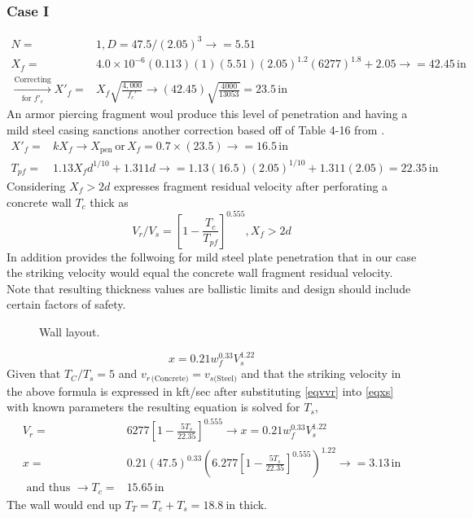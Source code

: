 \documentclass[]{article} %
\begin{document}
\subsubsection*{Case I}
\begin{align}\nonumber
 N=&1, D=47.5/(2.05)^3\rightarrow =5.51\\
X_f=&4.0\times10^{-6}(0.113)(1)(5.51)(2.05)^{1.2}(6277)^{1.8}+2.05\rightarrow=42.45\,\mathrm{in}\nonumber\\
\xrightarrow[\text{for }f'_c]{\text{Correcting}} X'_f=&X_f\sqrt{\frac{4,000}{f_c'}}\rightarrow(42.45)\sqrt{\frac{4000}{13053}}=23.5\,\mathrm{in}\nonumber
\end{align}
An armor piercing fragment woul produce this level of penetration and having a mild steel casing sanctions another correction based off of Table 4-16 from \cite{ufc3340022014}.
\begin{align}\nonumber
X'_f=&kX_f\rightarrow X_\mathrm{pen}\,\text{or}\, X_f=0.7\times(23.5)\rightarrow=16.5\,\mathrm{in}\\\nonumber
T_{pf}=&1.13X_fd^{1/10}+1.311d\rightarrow=1.13(16.5)(2.05)^{1/10}+1.311(2.05)=22.35\,\mathrm{in}\nonumber
\end{align} 
Considering $X_f>2d$ \cite{ufc3340022014} expresses fragment residual velocity after perforating a concrete wall $T_c$ thick as
\begin{equation}\label{eqvvr}
V_r/V_s=\left[1-\frac{T_c}{T_{pf}}\right]^{0.555}, X_f>2d
\end{equation}
In addition \cite{ufc3340022014} provides the follwoing for mild steel plate penetration that in our case the striking velocity would equal the concrete wall fragment residual velocity. Note that resulting thickness values are ballistic limits and design should include certain factors of safety.
\begin{figure}\centering\caption{Wall layout.}\label{fig01}
\end{figure}
\begin{equation}\label{eqxs}
x=0.21w_f^{0.33}V_s^{1.22}
\end{equation}
Given that $T_C/T_s=5$ and $v_{r\,\text{(Concrete)}}=v_{s\text{(Steel)}}$ and that the striking velocity in the above formula is expressed in kft/sec after substituting \cref{eqvvr} into \cref{eqxs} with known parameters the resulting equation is solved for $T_s$,
\begin{align}\nonumber
V_r=&6277\left[1-\frac{5T_s}{22.35}\right]^{0.555}\rightarrow x=0.21w_f^{0.33}V_s^{1.22}\\\nonumber
 x=&0.21(47.5)^{0.33}\left(6.277\left[1-\frac{5T_s}{22.35}\right]^{0.555}\right)^{1.22}\rightarrow=3.13\,\mathrm{in}\\\nonumber
 \text{ and thus }\rightarrow T_c=&15.65\,\mathrm{in}
\end{align}
The wall would end up $T_T=T_c+T_s=18.8~\mathrm{in}$ thick.
\end{document}
